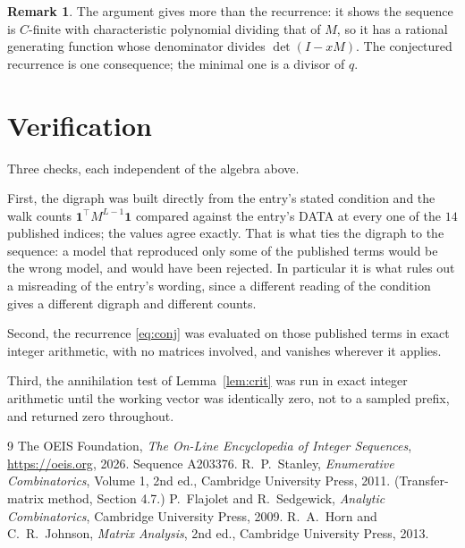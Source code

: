 \documentclass[11pt,a4paper]{article}
\theoremstyle{plain}
\theoremstyle{definition}
\newtheorem{remark}[theorem]{Remark}
\begin{document}
\begin{remark}
The argument gives more than the recurrence: it shows the sequence is $C$-finite with
characteristic polynomial dividing that of $M$, so it has a rational generating function
whose denominator divides $\det(I-xM)$. The conjectured recurrence is one consequence; the
minimal one is a divisor of $q$.
\end{remark}

\section{Verification}

Three checks, each independent of the algebra above.

First, the digraph was built directly from the entry's stated condition and the walk counts
$\mathbf{1}^{\!\top}M^{L-1}\mathbf{1}$ compared against the entry's DATA at
every one of the $14$ published indices; the values agree exactly. That is what ties
the digraph to the sequence: a model that reproduced only some of the published terms would
be the wrong model, and would have been rejected. In particular it is what rules out a
misreading of the entry's wording, since a different reading of the condition gives a
different digraph and different counts.

Second, the recurrence \eqref{eq:conj} was evaluated on those published terms in exact
integer arithmetic, with no matrices involved, and vanishes wherever it applies.

Third, the annihilation test of Lemma~\ref{lem:crit} was run in exact integer arithmetic
until the working vector was identically zero, not to a sampled prefix, and returned zero
throughout.

\begin{thebibliography}{9}
 The OEIS Foundation, \emph{The On-Line Encyclopedia of Integer
Sequences}, \url{https://oeis.org}, 2026. Sequence A203376.
 R.~P.~Stanley, \emph{Enumerative Combinatorics}, Volume 1, 2nd ed.,
Cambridge University Press, 2011. (Transfer-matrix method, Section 4.7.)
 P.~Flajolet and R.~Sedgewick, \emph{Analytic Combinatorics}, Cambridge
University Press, 2009.
 R.~A.~Horn and C.~R.~Johnson, \emph{Matrix Analysis}, 2nd ed., Cambridge
University Press, 2013.
\end{thebibliography}
\end{document}
